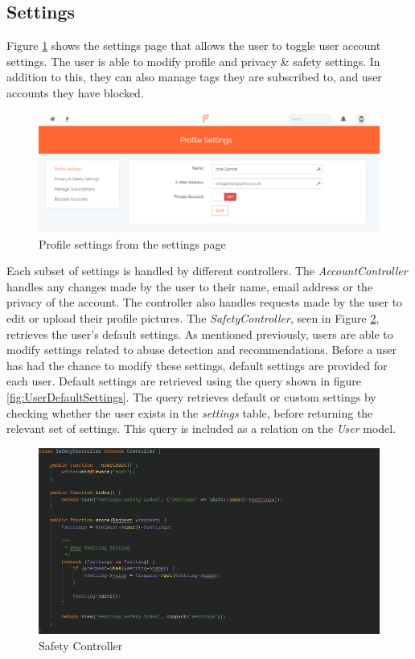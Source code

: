 \subsection{Settings}
Figure \ref{fig:SettingsImplementation} shows the settings page that allows the user to toggle user account settings. The user is able to modify profile and privacy \& safety settings. In addition to this, they can also manage tags they are subscribed to, and user accounts they have blocked.

\begin{figure}[H]
\centering
\includegraphics[width=\textwidth]{Images/Implementation/SettingsPage}
\caption{Profile settings from the settings page}
\label{fig:SettingsImplementation}
\end{figure}

Each subset of settings is handled by different controllers. The \textit{AccountController} handles any changes made by the user to their name, email address or the privacy of the account. The controller also handles requests made by the user to edit or upload their profile pictures. The \textit{SafetyController}, seen in Figure \ref{fig:SafetyController}, retrieves the user's default settings. As mentioned previously, users are able to modify settings related to abuse detection and recommendations. Before a user has had the chance to modify these settings, default settings are provided for each user. Default settings are retrieved using the query shown in figure \ref{fig:UserDefaultSettings}. The query retrieves default or custom settings by checking whether the user exists in the \emph{settings} table, before returning the relevant set of settings. This query is included as a relation on the \emph{User} model.

\begin{figure}[H]
\centering
\includegraphics[width=\textwidth]{Images/Implementation/SafetyController}
\caption{Safety Controller}
\label{fig:SafetyController}
\end{figure}

